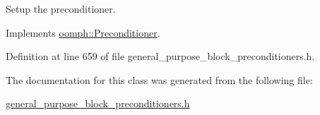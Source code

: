 Setup the preconditioner. 



Implements \hyperlink{classoomph_1_1Preconditioner_af4886f4efe510e5c9b0eb19422943588}{oomph\+::\+Preconditioner}.



Definition at line 659 of file general\+\_\+purpose\+\_\+block\+\_\+preconditioners.\+h.



The documentation for this class was generated from the following file\+:\begin{DoxyCompactItemize}
\item 
\hyperlink{general__purpose__block__preconditioners_8h}{general\+\_\+purpose\+\_\+block\+\_\+preconditioners.\+h}\end{DoxyCompactItemize}
